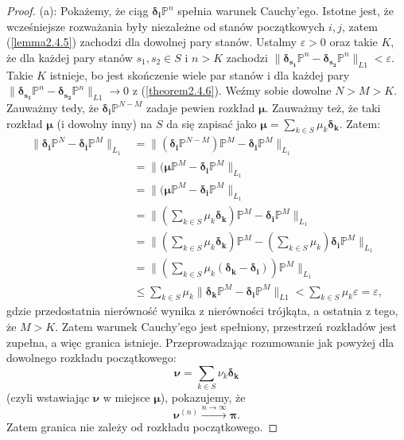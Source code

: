 \documentclass[a4paper]{article}
\theoremstyle{defn}
\theoremstyle{theorem}
\theoremstyle{lemma}
\theoremstyle{cor}
\theoremstyle{fact}
\begin{document}
\begin{proof}
(a): Pokażemy, że ciąg $\boldsymbol{\delta_i}\mathbb{P}^n$ spełnia warunek Cauchy'ego. Istotne jest, że wcześniejsze rozważania były niezależne od stanów początkowych $i, j$, zatem (\ref{lemma2.4.5}) zachodzi dla dowolnej pary stanów. Ustalmy $\varepsilon > 0$ oraz takie $K$, że dla każdej pary stanów $s_1, s_2 \in S$ i $n > K$  zachodzi $\|\boldsymbol{\delta_{s_1}}\mathbb{P}^n - \boldsymbol{\delta_{s_2}}\mathbb{P}^n\|_{L1} < \varepsilon$. Takie $K$ istnieje, bo jest skończenie wiele par stanów i dla każdej pary $\|\boldsymbol{\delta_{s_1}}\mathbb{P}^n - \boldsymbol{\delta_{s_2}}\mathbb{P}^n\|_{L1} \to 0$ z (\ref{theorem2.4.6}). Weźmy sobie dowolne $N > M > K$. Zauważmy tedy, że $\boldsymbol{\delta_i}\mathbb{P}^{N-M}$ zadaje pewien rozkład $\boldsymbol{\mu}$. Zauważmy też, że taki rozkład $\boldsymbol{\mu}$ (i dowolny inny) na $S$ da się zapisać jako $\boldsymbol{\mu} = \sum\limits_{k \in S} \mu_k\boldsymbol{\delta_k}$. Zatem:
\begin{align*}
\|\boldsymbol{\delta_i}\mathbb{P}^N - \boldsymbol{\delta_i}\mathbb{P}^M\|_{L_1} &= \|(\boldsymbol{\delta_i}\mathbb{P}^{N-M})\mathbb{P}^{M} - \boldsymbol{\delta_i}\mathbb{P}^M\|_{L_1}\\
&= \|(\boldsymbol{\mu}\mathbb{P}^{M} - \boldsymbol{\delta_i}\mathbb{P}^M\|_{L_1} \\
&= \|(\boldsymbol{\mu}\mathbb{P}^{M} - \boldsymbol{\delta_i}\mathbb{P}^M\|_{L_1} \\
&= \|(\sum\limits_{k \in S} \mu_k\boldsymbol{\delta_k})\mathbb{P}^{M} - \boldsymbol{\delta_i}\mathbb{P}^M\|_{L_1} \\
&= \|(\sum\limits_{k \in S} \mu_k\boldsymbol{\delta_k})\mathbb{P}^{M} - (\sum\limits_{k \in S} \mu_k)\boldsymbol{\delta_i}\mathbb{P}^M\|_{L_1} \\
&= \|(\sum\limits_{k \in S} \mu_k(\boldsymbol{\delta_k} - \boldsymbol{\delta_i}))\mathbb{P}^{M}\|_{L_1}  \\
&\leq  \sum\limits_{k \in S} \mu_k\|\boldsymbol{\delta_k}\mathbb{P}^M - \boldsymbol{\delta_i}\mathbb{P}^M\|_{L1} < \sum\limits_{k \in S} \mu_k\varepsilon = \varepsilon,
\end{align*}
gdzie przedostatnia nierówność wynika z nierówności trójkąta, a ostatnia z tego, że $M > K$. Zatem warunek Cauchy'ego jest spełniony, przestrzeń rozkładów jest zupełna, a więc granica istnieje. Przeprowadzając rozumowanie jak powyżej dla dowolnego rozkładu początkowego: $$\boldsymbol{\nu} = \sum\limits_{k \in S} \nu_k\boldsymbol{\delta_k}$$ (czyli wstawiając $\boldsymbol{\nu}$ w miejsce $\boldsymbol{\mu}$), pokazujemy, że $$\boldsymbol{\nu}^{(n)} \xrightarrow{n \to \infty} \boldsymbol{\pi}.$$ Zatem granica nie zależy od rozkładu początkowego.
\end{proof}
\end{document}
